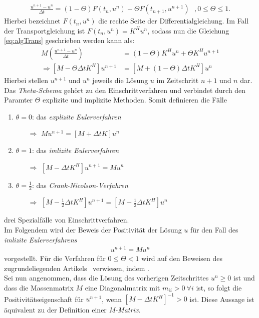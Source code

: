 \documentclass[a4paper,11pt]{article}
\begin{document}
\begin{align}
 \frac{u^{n+1}-u^n}{\Delta t}=(1-\Theta)F(t_n,u^n)+\Theta F(t_{n+1},u^{n+1})~~~,0\le\Theta\le1.
\end{align}
Hierbei bezeichnet $F(t_n,u^n)$ die rechte Seite der Differentialgleichung. Im Fall der Transportgleichung ist $F(t_n,u^n)=K^Hu^n$, sodass nun die Gleichung \eqref{eq:algTrans} geschrieben werden kann als:
\begin{align}
 M(\frac{u^{n+1}-u^n}{\Delta t})&=(1-\Theta)K^Hu^n+\Theta K^Hu^{n+1}\nonumber\\
\Rightarrow [M-\Theta\Delta tK^H]u^{n+1}&=[M+(1-\Theta)\Delta tK^H]u^n\label{eq:thetaGleich}
\end{align}
Hierbei stellen $u^{n+1}$ und $u^n$ jeweils die Lösung $u$ im Zeitschritt $n+1$  und $n$ dar. Das \textit{Theta-Schema} gehört zu den Einschrittverfahren und verbindet durch den Paramter $\Theta$ explizite und implizite Methoden. Somit definieren die Fälle
\begin{enumerate}
 \item $\theta=0$: das \textit{explizite Eulerverfahren}
 \begin{enumerate}
  \item[$\Rightarrow$] $Mu^{n+1}=[M+\Delta tK]u^n$
 \end{enumerate}
 \item $\theta=1$:    das \textit{imlizite Eulerverfahren}
 \begin{enumerate}
  \item[$\Rightarrow$] $[M-\Delta tK^H]u^{n+1}=Mu^n$
 \end{enumerate}
 \item $\theta=\frac{1}{2}$:  das \textit{Crank-Nicolson-Verfahren}
 \begin{enumerate}
  \item[$\Rightarrow$] $[M-\frac{1}{2}\Delta tK^H]u^{n+1}=[M+\frac{1}{2}\Delta tK^H]u^n$
 \end{enumerate}
\end{enumerate}
drei Spezialfälle von Einschrittverfahren.\\
Im Folgendem wird der Beweis der Positivität der Lösung $u$ für den Fall des \textit{imlizite Eulerverfahrens}
\begin{align}
 [M-\Delta tK^H]u^{n+1}=Mu^n\label{eq:LGS_H}
\end{align}
vorgestellt. Für die Verfahren für $0\le\Theta<1$ wird auf den Beweisen des zugrundeliegenden Artikels~\cite{kuzmin2002flux} verwiesen, indem .\\
Sei nun angenommen, dass die Lösung des vorherigen Zeitschrittes $u^n\ge0$ ist und dass die Massenmatrix $M$ eine Diagonalmatrix mit $m_{ii}>0~\forall i$ ist, so folgt die Positivitätseigenschaft für $u^{n+1}$, wenn $[M-\Delta tK^H]^{-1}>0$ ist. Diese Aussage ist äquivalent zu der Definition einer \textit{M-Matrix}.
\end{document}
